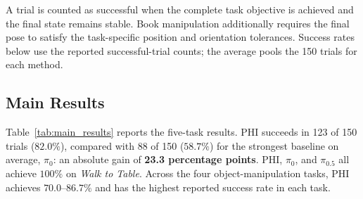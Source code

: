 \documentclass{article}
\begin{document}
A trial is counted as successful when the complete task objective is achieved and the final state remains stable. Book manipulation additionally requires the final pose to satisfy the task-specific position and orientation tolerances. Success rates below use the reported successful-trial counts; the average pools the 150 trials for each method.

\subsection{Main Results}
\label{sec:main_results}

Table~\ref{tab:main_results} reports the five-task results. PHI succeeds in 123 of 150 trials ($82.0\%$), compared with 88 of 150 ($58.7\%$) for the strongest baseline on average, $\pi_0$: an absolute gain of \textbf{23.3 percentage points}. PHI, $\pi_0$, and $\pi_{0.5}$ all achieve $100\%$ on \textit{Walk to Table}. Across the four object-manipulation tasks, PHI achieves $70.0$--$86.7\%$ and has the highest reported success rate in each task.
\end{document}
